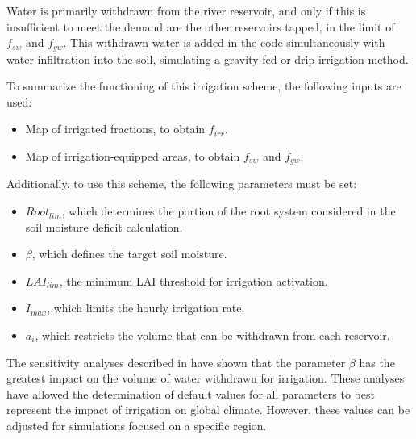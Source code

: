 Water is primarily withdrawn from the river reservoir, and only if this is insufficient to meet the demand are the other reservoirs tapped, in the limit of $f_{sw}$ and $f_{gw}$.
This withdrawn water is added in the code simultaneously with water infiltration into the soil, simulating a gravity-fed or drip irrigation method.

\hfill

To summarize the functioning of this irrigation scheme, the following inputs are used:
\begin{itemize}
    \item Map of irrigated fractions, to obtain $f_{irr}$.
    \item Map of irrigation-equipped areas, to obtain $f_{sw}$ and $f_{gw}$.
\end{itemize}

Additionally, to use this scheme, the following parameters must be set:
\begin{itemize}
    \item $Root_{lim}$, which determines the portion of the root system considered in the soil moisture deficit calculation.
    \item $\beta$, which defines the target soil moisture.
    \item $LAI_{lim}$, the minimum LAI threshold for irrigation activation.
    \item $I_{max}$, which limits the hourly irrigation rate.
    \item $a_i$, which restricts the volume that can be withdrawn from each reservoir.
\end{itemize}

The sensitivity analyses described in \cite{arboleda-obando_validation_2024} have shown that the parameter $\beta$ has the greatest impact on the volume of water withdrawn for irrigation. These analyses have allowed the determination of default values for all parameters to best represent the impact of irrigation on global climate. However, these values can be adjusted for simulations focused on a specific region.
